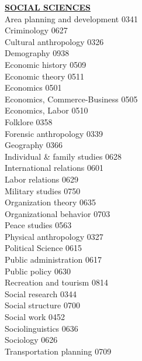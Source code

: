 \documentclass[9pt]{article}
\newcommand{\categoryheading}[1]{{\fontsize{8}{11}\selectfont \textbf{\uline{#1}}}}
\begin{document}
\begin{multicols}{3}
\categoryheading{SOCIAL SCIENCES} \leavevmode \\
Area planning and development \hfill 0341 \leavevmode \\
Criminology \hfill 0627 \leavevmode \\
Cultural anthropology \hfill 0326 \leavevmode \\
Demography \hfill 0938 \leavevmode \\
Economic history \hfill 0509 \leavevmode \\
Economic theory \hfill 0511 \leavevmode \\
Economics \hfill 0501 \leavevmode \\
Economics, Commerce-Business \hfill 0505 \leavevmode \\
Economics, Labor \hfill 0510 \leavevmode \\
Folklore \hfill 0358 \leavevmode \\
Forensic anthropology \hfill 0339 \leavevmode \\
Geography \hfill 0366 \leavevmode \\
Individual \& family studies \hfill 0628 \leavevmode \\
International relations \hfill 0601 \leavevmode \\
Labor relations \hfill 0629 \leavevmode \\
Military studies \hfill 0750 \leavevmode \\
Organization theory \hfill 0635 \leavevmode \\
Organizational behavior \hfill 0703 \leavevmode \\
Peace studies \hfill 0563 \leavevmode \\
Physical anthropology \hfill 0327 \leavevmode \\
Political Science \hfill 0615 \leavevmode \\
Public administration \hfill 0617 \leavevmode \\
Public policy \hfill 0630 \leavevmode \\
Recreation and tourism \hfill 0814 \leavevmode \\
Social research \hfill 0344 \leavevmode \\
Social structure \hfill 0700 \leavevmode \\
Social work \hfill 0452 \leavevmode \\
Sociolinguistics \hfill 0636 \leavevmode \\
Sociology \hfill 0626 \leavevmode \\
Transportation planning \hfill 0709 \leavevmode \\

\end{multicols}
\end{document}
